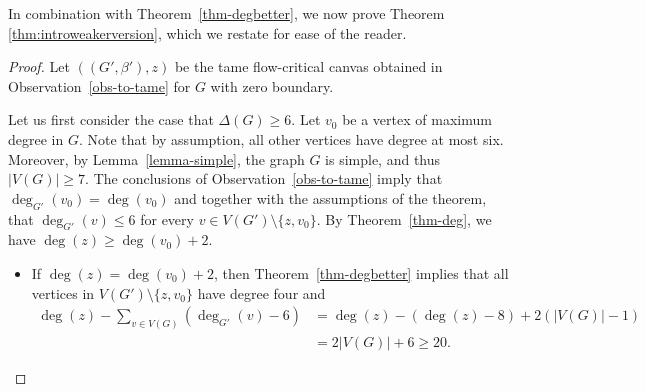 \documentclass{article}
\begin{document}
In combination with Theorem~\ref{thm-degbetter}, we now prove Theorem \ref{thm:introweakerversion}, which we restate for ease of the reader.

\thmintroweakerversion*


\begin{proof}
Let $((G',\beta'),z)$ be the tame flow-critical canvas obtained in Observation~\ref{obs-to-tame} for $G$ with zero boundary.

Let us first consider the case that $\Delta(G) \geq 6$.
Let $v_0$ be a vertex of maximum degree in $G$. Note that by assumption, all other vertices have degree at most six.  Moreover, by Lemma~\ref{lemma-simple},
the graph $G$ is simple, and thus $|V(G)|\ge 7$.  The conclusions of Observation~\ref{obs-to-tame}
imply that $\deg_{G'}(v_0)=\deg(v_0)$ and together with the assumptions of the theorem, that $\deg_{G'} (v)\le 6$ for every $v\in V(G')\setminus\{z,v_0\}$.
By Theorem~\ref{thm-deg}, we have $\deg(z)\ge \deg(v_0)+2$. 
\begin{itemize}
\item If $\deg(z)=\deg(v_0)+2$, then Theorem~\ref{thm-degbetter} implies that
all vertices in $V(G')\setminus\{z,v_0\}$ have degree four and 
\begin{align*}
    \deg(z)-\sum_{v\in V(G)} (\deg_{G'}(v)-6)&=\deg(z)-(\deg(z)-8)+2(|V(G)|-1)\\[-0.2cm]
    & =2|V(G)|+6\ge 20.   
\end{align*}


\end{itemize}
\end{proof}
\end{document}

